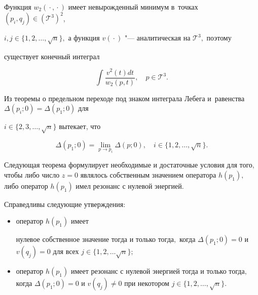\smallskip



Функция $w_2({}\cdot{}, {}\cdot{})$ имеет невырожденный минимум в~точках \mbox{$(p_i, q_j)\in ({\mathcal T}^3)^2$,}

$i, j \in \{1, 2, \dots, \sqrt{n} \},$ а функция $v({}\cdot{})$ "--- аналитическая на ${\mathcal T}^3,$ поэтому

существует конечный интеграл

$$

\int\frac{v^2(t)dt}{w_2(p, t)},\quad  p\in {\mathcal T}^3.

$$



Из теоремы о предельном переходе под знаком интеграла Лебега и~равенства $\Delta(p_i; 0)=\Delta(p_1; 0)$ для

$i\in \{2, 3, \dots, \sqrt{n}\}$ вытекает, что

$$

\Delta(p_1; 0)=\lim\limits_{p\to p_i}\Delta(p; 0),\quad i\in \{1, 2, \dots, \sqrt{n}\}.

$$



Следующая теорема формулирует необходимые и достаточные условия для того, чтобы либо число $z=0$ являлось собственным значением оператора $h(p_{1}),$ либо оператор $h(p_{1})$ имел резонанс с нулевой энергией.



\smallskip \hypertarget{ras2:thm:1}{}

\begin{theorem}[1]Справедливы следующие утверждения\/{\rm:}

\begin{itemize}

\item[{\rm а)}] оператор $h(p_{1})$ имеет 

нулевое собственное значение тогда и только тогда$,$ когда $\Delta(p_1; 0)=0$ и $v(q_j)=0$ для всех $j\in \{1, 2, \dots \sqrt{n}\};$



\item[{\rm б)}] оператор $h(p_{1})$ имеет резонанс с нулевой энергией тогда и только тогда$,$ когда $\Delta(p_1; 0) =0$ и $v(q_j)\neq 0$ при некотором $j\in \{1, 2, \dots, {\sqrt{n}}\}.$



\end{itemize}

\end{theorem}




